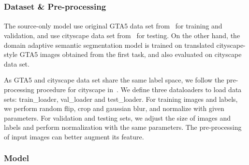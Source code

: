 \subsubsection{Dataset \& Pre-processing}
\paragraph{}
The source-only model use original GTA5 data set from~\cite{richter2016playing} for training and validation, and use cityscape data set from~\cite{cordts2016cityscapes} for testing. On the other hand, the domain adaptive semantic segmentation model is trained on translated cityscape-style GTA5 images obtained from the first task, and also evaluated on cityscape data set.

As GTA5 and cityscape data set share the same label space, we follow the pre-processing procedure for cityscape in~\cite{Deeplab}. We define three dataloaders to load data sets: train\_loader, val\_loader and test\_loader. For training images and labels, we perform random flip, crop and gaussian blur, and normalize with given parameters. For validation and testing sets, we adjust the size of images and labels and perform normalization with the same parameters. The pre-processing of input images can better augment its feature.
\subsubsection{Model}
